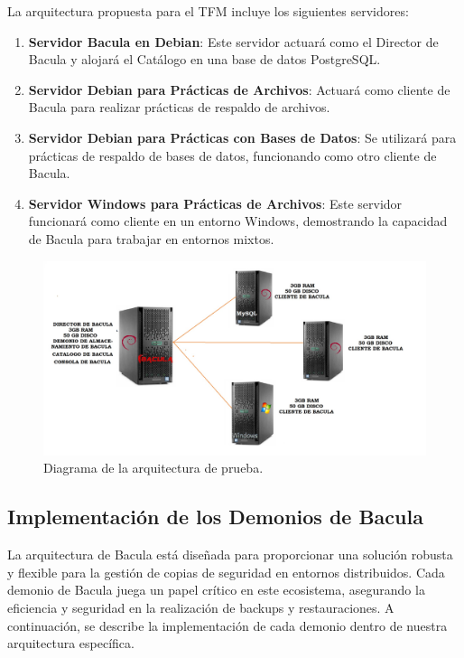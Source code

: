 La arquitectura propuesta para el TFM incluye los siguientes servidores:

\begin{enumerate}
    \item \textbf{Servidor Bacula en Debian}: Este servidor actuará como el Director de Bacula y alojará el Catálogo en una base de datos PostgreSQL.
    \item \textbf{Servidor Debian para Prácticas de Archivos}: Actuará como cliente de Bacula para realizar prácticas de respaldo de archivos.
    \item \textbf{Servidor Debian para Prácticas con Bases de Datos}: Se utilizará para prácticas de respaldo de bases de datos, funcionando como otro cliente de Bacula.
    \item \textbf{Servidor Windows para Prácticas de Archivos}: Este servidor funcionará como cliente en un entorno Windows, demostrando la capacidad de Bacula para trabajar en entornos mixtos.
\end{enumerate}







\begin{figure}[H]
    \centering
    \includegraphics[width=1\textwidth]{imagenes/graficos/BACULA.jpg} %
    \caption{Diagrama de la arquitectura de prueba.}
    \label{fig:mi-grafico}
\end{figure}





\subsection{Implementación de los Demonios de Bacula}

La arquitectura de Bacula está diseñada para proporcionar una solución robusta y flexible para la gestión de copias de seguridad en entornos distribuidos. Cada demonio de Bacula juega un papel crítico en este ecosistema, asegurando la eficiencia y seguridad en la realización de backups y restauraciones. A continuación, se describe la implementación de cada demonio dentro de nuestra arquitectura específica.

